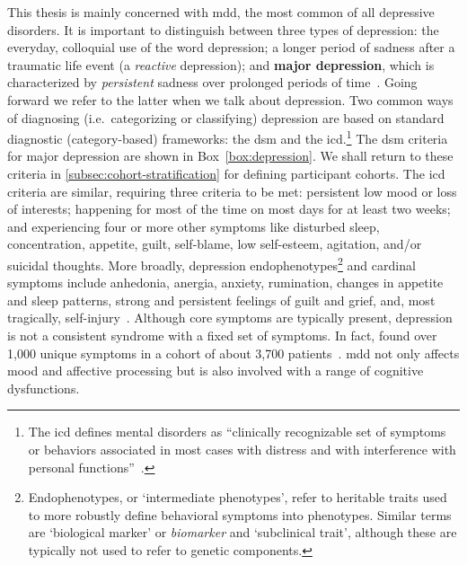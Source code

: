 This thesis is mainly concerned with \gls{mdd}, the most common of all depressive disorders.
It is important to distinguish between three types of depression: the everyday, colloquial use of the word depression; a longer period of sadness after a traumatic life event (a \emph{reactive} depression); and \textbf{major depression}, which is characterized by \emph{persistent} sadness over prolonged periods of time~\parencite{Otte2016}.
Going forward we refer to the latter when we talk about depression.
Two common ways of diagnosing (i.e.~categorizing or classifying) depression are based on standard diagnostic (category-based) frameworks: the \gls{dsm} and the \gls{icd}.\footnote{The \gls{icd} defines mental disorders as ``clinically recognizable set of symptoms or behaviors associated in most cases with distress and with interference with personal functions''~\parencite{WHO1992}.}
The \gls{dsm} criteria for major depression are shown in Box~\ref{box:depression}.
We shall return to these criteria in \cref{subsec:cohort-stratification} for defining participant cohorts.
The \gls{icd} criteria are similar, requiring three criteria to be met: persistent low mood or loss of interests; happening for most of the time on most days for at least two weeks; and experiencing four or more other symptoms like disturbed sleep, concentration, appetite, guilt, self-blame, low self-esteem, agitation, and/or suicidal thoughts.
More broadly, depression endophenotypes\footnote{Endophenotypes, or `intermediate phenotypes', refer to heritable traits used to more robustly define behavioral symptoms into phenotypes. Similar terms are `biological marker' or \emph{biomarker} and `subclinical trait', although these are typically not used to refer to genetic components.} and cardinal symptoms include anhedonia, anergia, anxiety, rumination, changes in appetite and sleep patterns, strong and persistent feelings of guilt and grief, and, most tragically, self-injury~\parencite{Goldstein2014, Pizzagalli2014}.
Although core symptoms are typically present, depression is not a consistent syndrome with a fixed set of symptoms.
In fact, \textcite{Fried2015} found over 1,000 unique symptoms in a cohort of about 3,700 patients~\parencite[see also][]{Fried2015b}.
\Gls{mdd} not only affects mood and affective processing but is also involved with a range of cognitive dysfunctions.

